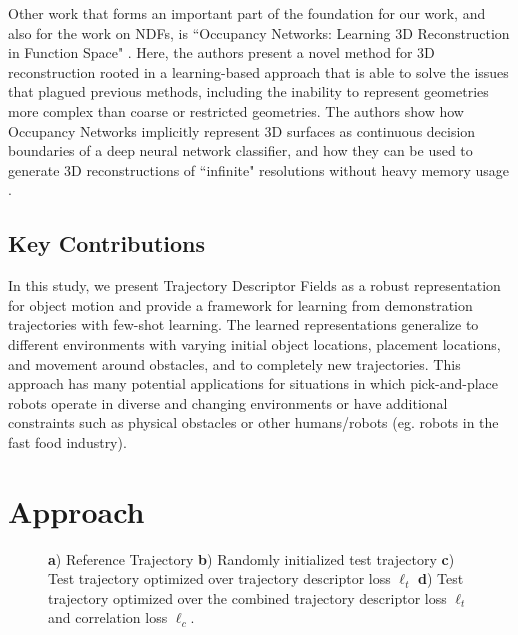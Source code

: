 \documentclass[10pt,twocolumn,letterpaper]{article}
\begin{document}
Other work that forms an important part of the foundation for our work, and also for the work on NDFs, is ``Occupancy Networks: Learning 3D Reconstruction in Function Space" \cite{mescheder2019occupancy}. Here, the authors present a novel method for 3D reconstruction rooted in a learning-based approach that is able to solve the issues that plagued previous methods, including the inability to represent geometries more complex than coarse or restricted geometries. The authors show how Occupancy Networks implicitly represent 3D surfaces as continuous decision boundaries of a deep neural network classifier, and how they can be used to generate 3D reconstructions of ``infinite" resolutions without heavy memory usage \cite{mescheder2019occupancy}.

\subsection{Key Contributions}

In this study, we present Trajectory Descriptor Fields as a robust representation for object motion and provide a framework for learning from demonstration trajectories with few-shot learning. The learned representations generalize to different environments with varying initial object locations, placement locations, and movement around obstacles, and to completely new trajectories. This approach has many potential applications for situations in which pick-and-place robots operate in diverse and changing environments or have additional constraints such as physical obstacles or other humans/robots (eg. robots in the fast food industry).


\section{Approach}

\begin{figure}[t]
\centering
\setlength\fboxsep{0pt}
\setlength\fboxrule{0.4pt}
\caption{\textbf{a}) Reference Trajectory  \textbf{b}) Randomly initialized test trajectory  \textbf{c}) Test trajectory optimized over trajectory descriptor loss $\ell_t$  \textbf{d}) Test trajectory optimized over the combined trajectory descriptor loss $\ell_t$ and correlation loss $\ell_c$.}
\label{fig:traj_prog}
\end{figure}
\end{document}
